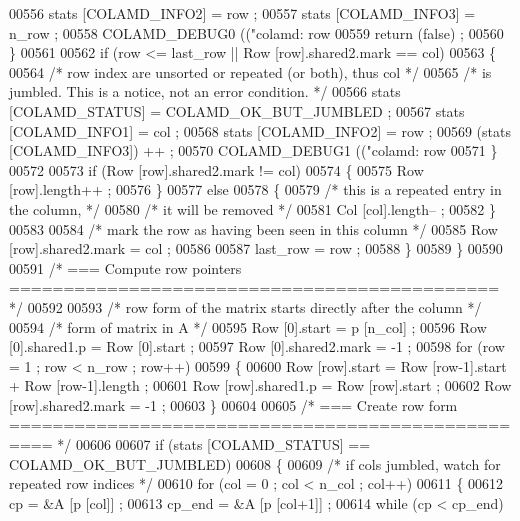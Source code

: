 \begin{DoxyCode}
{{{{{{{{00556     stats [COLAMD\_INFO2] = row ;
00557     stats [COLAMD\_INFO3] = n\_row ;
00558     COLAMD\_DEBUG0 ((\textcolor{stringliteral}{"colamd: row %
00559     \textcolor{keywordflow}{return} (\textcolor{keyword}{false}) ;
00560       \}
00561 
00562       \textcolor{keywordflow}{if} (row <= last\_row || Row [row].shared2.mark == col)
00563       \{
00564     \textcolor{comment}{/* row index are unsorted or repeated (or both), thus col */}
00565     \textcolor{comment}{/* is jumbled.  This is a notice, not an error condition. */}
00566     stats [COLAMD\_STATUS] = COLAMD\_OK\_BUT\_JUMBLED ;
00567     stats [COLAMD\_INFO1] = col ;
00568     stats [COLAMD\_INFO2] = row ;
00569     (stats [COLAMD\_INFO3]) ++ ;
00570     COLAMD\_DEBUG1 ((\textcolor{stringliteral}{"colamd: row %
00571       \}
00572 
00573       \textcolor{keywordflow}{if} (Row [row].shared2.mark != col)
00574       \{
00575     Row [row].length++ ;
00576       \}
00577       \textcolor{keywordflow}{else}
00578       \{
00579     \textcolor{comment}{/* this is a repeated entry in the column, */}
00580     \textcolor{comment}{/* it will be removed */}
00581     Col [col].length-- ;
00582       \}
00583 
00584       \textcolor{comment}{/* mark the row as having been seen in this column */}
00585       Row [row].shared2.mark = col ;
00586 
00587       last\_row = row ;
00588     \}
00589   \}
00590 
00591   \textcolor{comment}{/* === Compute row pointers ============================================= */}
00592 
00593   \textcolor{comment}{/* row form of the matrix starts directly after the column */}
00594   \textcolor{comment}{/* form of matrix in A */}
00595   Row [0].start = p [n\_col] ;
00596   Row [0].shared1.p = Row [0].start ;
00597   Row [0].shared2.mark = -1 ;
00598   \textcolor{keywordflow}{for} (row = 1 ; row < n\_row ; row++)
00599   \{
00600     Row [row].start = Row [row-1].start + Row [row-1].length ;
00601     Row [row].shared1.p = Row [row].start ;
00602     Row [row].shared2.mark = -1 ;
00603   \}
00604 
00605   \textcolor{comment}{/* === Create row form ================================================== */}
00606 
00607   \textcolor{keywordflow}{if} (stats [COLAMD\_STATUS] == COLAMD\_OK\_BUT\_JUMBLED)
00608   \{
00609     \textcolor{comment}{/* if cols jumbled, watch for repeated row indices */}
00610     \textcolor{keywordflow}{for} (col = 0 ; col < n\_col ; col++)
00611     \{
00612       cp = &A [p [col]] ;
00613       cp\_end = &A [p [col+1]] ;
00614       \textcolor{keywordflow}{while} (cp < cp\_end)
}}}}}}}}}}
\end{DoxyCode}
